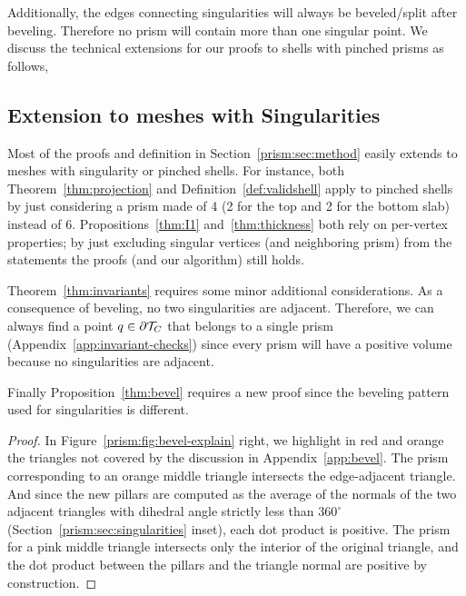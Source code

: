 Additionally, the edges connecting singularities will always be beveled/split after beveling. Therefore no prism will contain more than one singular point.
We discuss the technical extensions for our proofs to shells with pinched prisms as follows,

\subsection{Extension to meshes with Singularities}\label{sec:extend-singularity}
Most of the proofs and definition in Section~\ref{prism:sec:method} easily extends to meshes with singularity or pinched shells. For instance,
{both} Theorem~\ref{thm:projection} and Definition~\ref{def:validshell} apply to pinched shells by just considering a prism made of 4 (2 for the top and 2 for the bottom slab) instead of 6. Propositions~\ref{thm:I1} and~\ref{thm:thickness} both rely on per-vertex properties; by just excluding singular vertices (and neighboring prism) from the statements the proofs (and our algorithm) still holds.


Theorem~\ref{thm:invariants} requires some minor additional considerations. As a consequence of beveling, no two singularities are adjacent. Therefore, we can always find a point $q \in \partial \mathcal{T}_C$ that belongs to a single prism (Appendix~\ref{app:invariant-checks}) since every prism will have a positive volume
because no singularities are adjacent.


Finally Proposition~\ref{thm:bevel} requires a new proof since the beveling pattern used for singularities is different.
\begin{proof}
In  Figure~\ref{prism:fig:bevel-explain} right, we highlight in red and orange the triangles not covered by the discussion in Appendix~\ref{app:bevel}. 
The prism corresponding to an orange middle triangle intersects the edge-adjacent triangle. And since the new pillars are computed as the average of the normals of the two adjacent triangles with dihedral angle strictly less than $360^\circ$ 
 (Section~\ref{prism:sec:singularities} inset), each dot product is positive. 
The prism {for} a pink middle triangle intersects only the interior of the original triangle, and the dot product between the pillars and the triangle normal are positive by construction. 
\end{proof}



